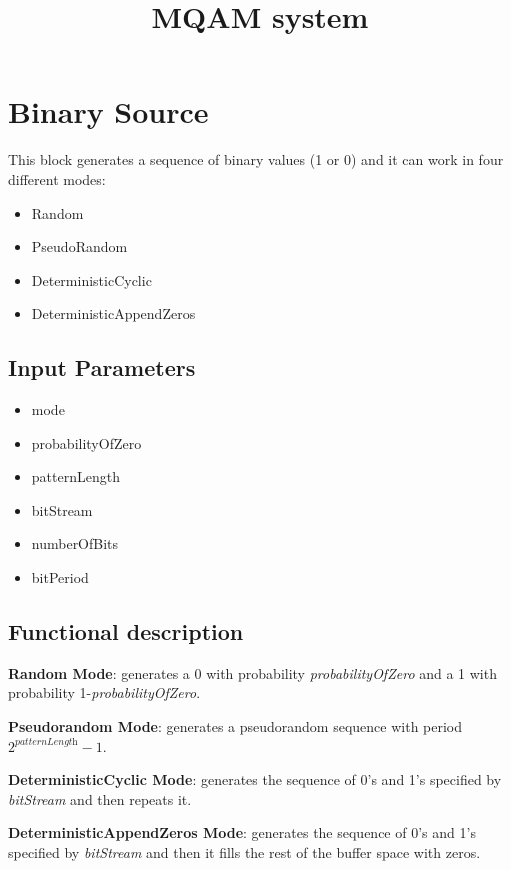 \documentclass[a4paper]{article}
\title{MQAM system}
\begin{document}
\maketitle

\section*{Binary Source}

This block generates a sequence of binary values (1 or 0) and it can work in four different modes: 

\begin{itemize}
	\item Random
	\item PseudoRandom 
	\item DeterministicCyclic 
	\item DeterministicAppendZeros 
\end{itemize}

\subsection*{Input Parameters}

\begin{multicols}{2}
	\begin{itemize}
		\item mode
		\item probabilityOfZero 
		\item patternLength 
		\item bitStream 
		\item numberOfBits 
		\item bitPeriod 
	\end{itemize}
\end{multicols}

\subsection*{Functional description}


\textbf{Random Mode}:
generates a 0 with probability \textit{probabilityOfZero} and a 1 with probability 1-\textit{probabilityOfZero}.

\textbf{Pseudorandom Mode}: 
generates a pseudorandom sequence with period $2^\textit{patternLength}-1$.

\textbf{DeterministicCyclic Mode}:
generates the sequence of 0's and 1's specified by \textit{bitStream} and then repeats it.

\textbf{DeterministicAppendZeros Mode}:
generates the sequence of 0's and 1's specified by \textit{bitStream} and then it fills the rest of the buffer space with zeros.
\end{document}
